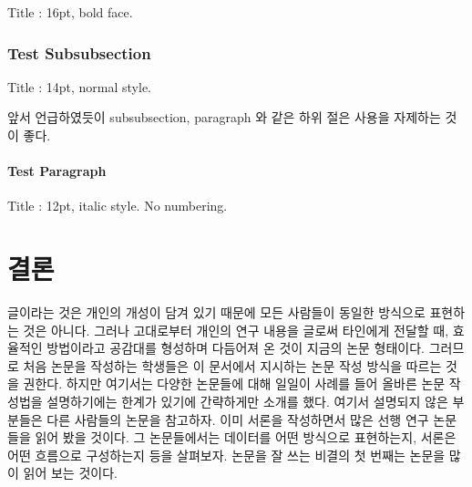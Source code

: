 \documentclass[twoside,11pt]{gshs_thesis}
\begin{document}
Title : 16pt, bold face.

\subsubsection{Test Subsubsection}

Title : 14pt, normal style.

앞서 언급하였듯이 subsubsection, paragraph 와 같은 하위 절은 사용을 자제하는 것이 좋다.

\paragraph{Test Paragraph}

Title : 12pt, italic style. No numbering.


\section{결론}
글이라는 것은 개인의 개성이 담겨 있기 때문에 모든 사람들이 동일한 방식으로 표현하는 것은 아니다. 그러나 고대로부터 개인의 연구 내용을 글로써 타인에게 전달할 때, 효율적인 방법이라고 공감대를 형성하며 다듬어져 온 것이 지금의 논문 형태이다. 그러므로 처음 논문을 작성하는 학생들은 이 문서에서 지시하는 논문 작성 방식을 따르는 것을 권한다. 하지만 여기서는 다양한 논문들에 대해 일일이 사례를 들어 올바른 논문 작성법을 설명하기에는 한계가 있기에 간략하게만 소개를 했다. 여기서 설명되지 않은 부분들은 다른 사람들의 논문을 참고하자. 이미 서론을 작성하면서 많은 선행 연구 논문들을 읽어 봤을 것이다. 그 논문들에서는 데이터를 어떤 방식으로 표현하는지, 서론은 어떤 흐름으로 구성하는지 등을 살펴보자. 논문을 잘 쓰는 비결의 첫 번째는 논문을 많이 읽어 보는 것이다.
\end{document}

